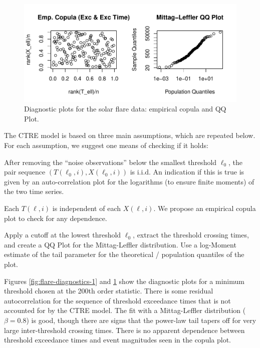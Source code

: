 \documentclass[smallextended]{svjour3}       %
\providecommand{\tightlist}{%
  \setlength{\itemsep}{0pt}\setlength{\parskip}{0pt}}
\begin{document}
\begin{figure}
\includegraphics[width=\textwidth]{article_springer_files/figure-latex/flare-diagnostics-2-1} \caption{Diagnostic plots for the solar flare data: empirical copula and QQ Plot. \label{fig:flare-diagnostics-2}}\label{fig:flare-diagnostics-2}
\end{figure}

The CTRE model is based on three main assumptions, which are repeated
below. For each assumption, we suggest one means of checking if it
holds:

\begin{description}
\tightlist
\item[i.i.d.:]
After removing the ``noise observations'' below the smallest threshold
\(\ell_0\), the pair sequence \((T(\ell_0, i), X(\ell_0,i))\) is i.i.d.
An indication if this is true is given by an auto-correlation plot for
the logarithms (to ensure finite moments) of the two time series.
\item[Uncoupled:]
Each \(T(\ell, i)\) is independent of each \(X(\ell, i)\). We propose an
empirical copula plot to check for any dependence.
\item[\({\rm ML}(\beta, \sigma)\) distribution of \(T(\ell, i)\):]
Apply a cutoff at the lowest threshold \(\ell_0\), extract the threshold
crossing times, and create a QQ Plot for the Mittag-Leffler
distribution. Use a log-Moment estimate of the tail parameter for the
theoretical / population quantiles of the plot.
\end{description}

Figures \ref{fig:flare-diagnostics-1} and \ref{fig:flare-diagnostics-2}
show the diagnostic plots for a minimum threshold chosen at the 200th
order statistic. There is some residual autocorrelation for the sequence
of threshold exceedance times that is not accounted for by the CTRE
model. The fit with a Mittag-Leffler distribution (\(\beta = 0.8\)) is
good, though there are signs that the power-law tail tapers off for very
large inter-threshold crossing times. There is no apparent dependence
between threshold exceedance times and event magnitudes seen in the
copula plot.
\end{document}
